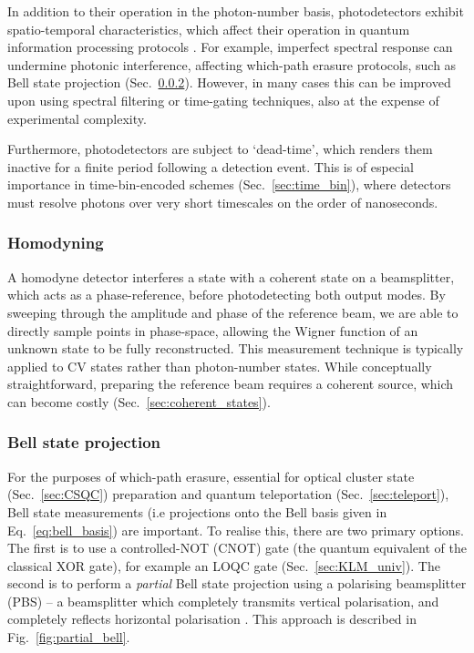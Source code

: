 \documentclass[aps,rmp,twocolumn,amsmath,amssymb,nofootinbib,superscriptaddress,longbibliography,floatfix]{revtex4-1}
\begin{document}
In addition to their operation in the photon-number basis, photodetectors exhibit spatio-temporal characteristics, which affect their operation in quantum information processing protocols \cite{RohdePDReview}. For example, imperfect spectral response can undermine photonic interference, affecting which-path erasure protocols, such as Bell state projection (Sec.~\ref{sec:bell_proj}). However, in many cases this can be improved upon using spectral filtering or time-gating techniques, also at the expense of experimental complexity.

Furthermore, photodetectors are subject to `dead-time', which renders them inactive for a finite period following a detection event. This is of especial importance in time-bin-encoded schemes (Sec.~\ref{sec:time_bin}), where detectors must resolve photons over very short timescales on the order of nanoseconds.

%
%

\subsubsection{Homodyning} \label{sec:homodyne}

A homodyne detector interferes a state with a coherent state on a beamsplitter, which acts as a phase-reference, before photodetecting both output modes. By sweeping through the amplitude and phase of the reference beam, we are able to directly sample points in phase-space, allowing the Wigner function of an unknown state to be fully reconstructed. This measurement technique is typically applied to CV states rather than photon-number states. While conceptually straightforward, preparing the reference beam requires a coherent source, which can become costly (Sec.~\ref{sec:coherent_states}).

%
%

\subsubsection{Bell state projection} \label{sec:bell_proj}

For the purposes of which-path erasure, essential for optical cluster state (Sec.~\ref{sec:CSQC}) preparation and quantum teleportation (Sec.~\ref{sec:teleport}), Bell state measurements (i.e projections onto the Bell basis given in Eq.~\ref{eq:bell_basis}) are important. To realise this, there are two primary options. The first is to use a controlled-NOT (CNOT) gate (the quantum equivalent of the classical XOR gate), for example an LOQC gate (Sec.~\ref{sec:KLM_univ}). The second is to perform a \emph{partial} Bell state projection using a polarising beamsplitter (PBS) -- a beamsplitter which completely transmits vertical polarisation, and completely reflects horizontal polarisation \cite{bib:BraunsteinMann95}. This approach is described in Fig.~\ref{fig:partial_bell}.
\end{document}
